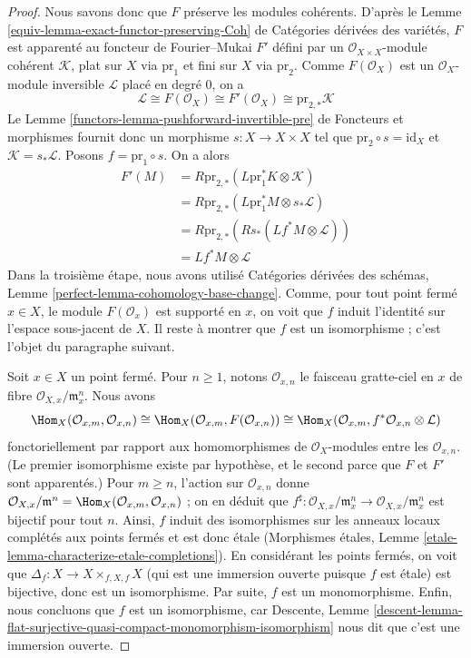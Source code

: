 \begin{proof}
\medskip\noindent
Nous savons donc que $F$ préserve les modules cohérents. D'après le Lemme
\ref{equiv-lemma-exact-functor-preserving-Coh} de Catégories dérivées des
variétés, $F$ est apparenté au foncteur de Fourier--Mukai $F'$ défini par
un $\mathcal{O}_{X \times X}$-module cohérent $\mathcal{K}$, plat sur
$X$ via $\text{pr}_1$ et fini sur $X$ via $\text{pr}_2$. Comme
$F(\mathcal{O}_X)$ est un $\mathcal{O}_X$-module inversible
$\mathcal{L}$ placé en degré $0$, on a
$$
\mathcal{L} \cong F(\mathcal{O}_X) \cong F'(\mathcal{O}_X) \cong
\text{pr}_{2, *}\mathcal{K}
$$
Le Lemme \ref{functors-lemma-pushforward-invertible-pre} de Foncteurs et
morphismes fournit donc un morphisme $s : X \to X \times X$ tel que
$\text{pr}_2 \circ s = \text{id}_X$ et $\mathcal{K} = s_*\mathcal{L}$.
Posons $f = \text{pr}_1 \circ s$. On a alors
\begin{align*}
F'(M)
& =
R\text{pr}_{2, *}(L\text{pr}_1^*K \otimes \mathcal{K}) \\
& =
R\text{pr}_{2, *}(L\text{pr}_1^*M \otimes s_*\mathcal{L}) \\
& =
R\text{pr}_{2, *}(Rs_*(Lf^*M \otimes \mathcal{L})) \\
& =
Lf^*M \otimes \mathcal{L}
\end{align*}
Dans la troisième étape, nous avons utilisé Catégories dérivées des
schémas, Lemme \ref{perfect-lemma-cohomology-base-change}.
Comme, pour tout point fermé $x \in X$, le module
$F(\mathcal{O}_x)$ est supporté en $x$, on voit que $f$ induit l'identité
sur l'espace sous-jacent de $X$. Il reste à montrer que $f$
est un isomorphisme ; c'est l'objet du paragraphe suivant.

\medskip\noindent
Soit $x \in X$ un point fermé. Pour $n \geq 1$, notons
$\mathcal{O}_{x, n}$ le faisceau gratte-ciel en $x$ de fibre
$\mathcal{O}_{X, x}/\mathfrak m_x^n$. Nous avons
$$
\Hom_X(\mathcal{O}_{x, m}, \mathcal{O}_{x, n}) \cong
\Hom_X(\mathcal{O}_{x, m}, F(\mathcal{O}_{x, n})) \cong
\Hom_X(\mathcal{O}_{x, m}, f^*\mathcal{O}_{x, n} \otimes \mathcal{L})
$$
fonctoriellement par rapport aux homomorphismes de $\mathcal{O}_X$-modules
entre les $\mathcal{O}_{x, n}$. (Le premier isomorphisme existe par
hypothèse, et le second parce que $F$ et $F'$ sont apparentés.) Pour
$m \geq n$, l'action sur $\mathcal{O}_{x, n}$ donne
$\mathcal{O}_{X, x}/\mathfrak m^n =
\Hom_X(\mathcal{O}_{x, m}, \mathcal{O}_{x, n})$ ; on en déduit que
$f^\sharp : \mathcal{O}_{X, x}/\mathfrak m_x^n \to
\mathcal{O}_{X, x}/\mathfrak m_x^n$ est bijectif pour tout $n$. Ainsi,
$f$ induit des isomorphismes sur les anneaux locaux complétés aux points
fermés et est donc étale (Morphismes étales, Lemme
\ref{etale-lemma-characterize-etale-completions}). En considérant les
points fermés, on voit que
$\Delta_f : X \to X \times_{f, X, f} X$ (qui est une immersion ouverte
puisque $f$ est étale) est bijective, donc est un isomorphisme. Par suite,
$f$ est un monomorphisme. Enfin, nous concluons que $f$ est un isomorphisme, car Descente, Lemme
\ref{descent-lemma-flat-surjective-quasi-compact-monomorphism-isomorphism}
nous dit que c’est une immersion ouverte.
\end{proof}








